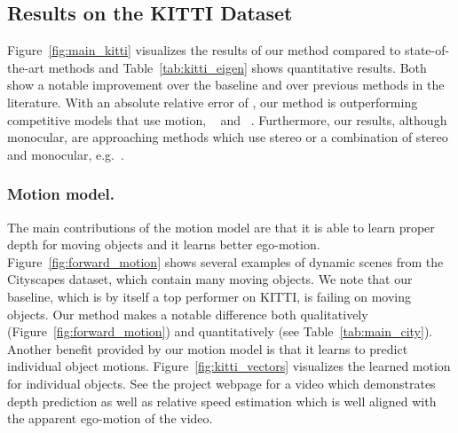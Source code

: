 \documentclass[letterpaper]{article} \usepackage{aaai19}  \usepackage{times}  \usepackage{helvet}  \usepackage{courier}  \usepackage{url}  \usepackage{graphicx}  \frenchspacing
\begin{document}
\subsection{Results on the KITTI Dataset}
Figure~\ref{fig:main_kitti} visualizes the results of our method compared to state-of-the-art methods and Table~\ref{tab:kitti_eigen} shows quantitative results. Both show a notable improvement over the baseline and over previous methods in the literature. With an absolute relative error of , our method is outperforming competitive models that use motion, ~\cite{yang2018every} and ~\cite{yin2018geonet}. 
Furthermore, our results, although monocular, are approaching methods which use stereo or a combination of stereo and monocular, e.g.~\cite{godard2017monodepth,Kuznietsov2017semisupervised,yang2018every,godard2018digging}.

\subsubsection{Motion model.}
The main contributions of the motion model are that it is able to learn proper depth for moving objects and  it learns better ego-motion.
Figure~\ref{fig:forward_motion} shows several examples of dynamic scenes from the Cityscapes dataset, which contain many moving objects. We note that our baseline, which is by itself a top performer on KITTI, is failing on moving objects. Our method makes a notable difference both qualitatively (Figure~\ref{fig:forward_motion}) and quantitatively (see Table~\ref{tab:main_city}).   
Another benefit provided by our motion model is that it learns to predict individual object motions. Figure~\ref{fig:kitti_vectors} visualizes the learned motion for individual objects.
See the project webpage for a video which demonstrates depth prediction as well as relative speed estimation which is well aligned with the apparent ego-motion of the video.

\begin{table} [h!]
\centering
{}
\caption{Quantitative evaluation of odometry on the KITTI Odometry test sequences. Methods using more information than a set of rolling 3-frames are marked (*). Models that are trained on a different part of the dataset are marked ().}
\label{fig:kitti_vo}
\end{table}
\vspace{-0.2cm}
\end{document}
